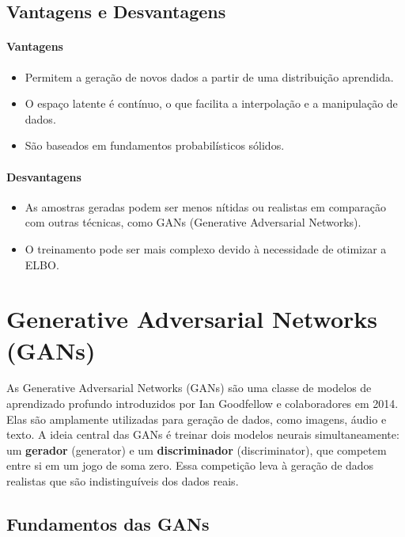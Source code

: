 \documentclass{tufte-handout}
\begin{document}
\subsection{Vantagens e Desvantagens}

\paragraph{Vantagens}
\begin{itemize}
    \item Permitem a geração de novos dados a partir de uma distribuição aprendida.
    \item O espaço latente é contínuo, o que facilita a interpolação e a manipulação de dados.
    \item São baseados em fundamentos probabilísticos sólidos.
\end{itemize}


\paragraph{Desvantagens}
\begin{itemize}
    \item As amostras geradas podem ser menos nítidas ou realistas em comparação com outras técnicas, como GANs (Generative Adversarial Networks).
    \item O treinamento pode ser mais complexo devido à necessidade de otimizar a ELBO.

\end{itemize}

\section{Generative Adversarial Networks (GANs)}

As Generative Adversarial Networks (GANs) são uma classe de modelos de aprendizado profundo introduzidos por Ian Goodfellow e colaboradores em 2014. Elas são amplamente utilizadas para geração de dados, como imagens, áudio e texto. A ideia central das GANs é treinar dois modelos neurais simultaneamente: um \textbf{gerador} (generator) e um \textbf{discriminador} (discriminator), que competem entre si em um jogo de soma zero. Essa competição leva à geração de dados realistas que são indistinguíveis dos dados reais.

\subsection{Fundamentos das GANs}
\end{document}
